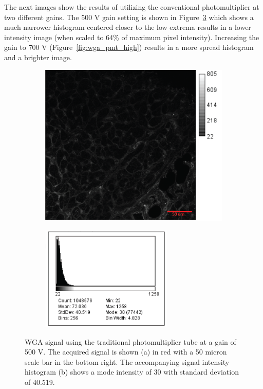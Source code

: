 \documentclass[12pt]{article}
\begin{document}
The next images show the results of utilizing the conventional photomultiplier at two different gains. The 500 V gain setting is shown in Figure~\ref{fig:wga_pmt_low} which shows a much narrower histogram centered closer to the low extrema results in a lower intensity image (when scaled to 64\% of maximum pixel intensity). Increasing the gain to 700 V (Figure~\ref{fig:wga_pmt_high}) results in a more spread histogram and a brighter image.

\begin{figure}[H]
	\begin{subfigure}{.5\textwidth}
		\centering
		\includegraphics[width=.95\linewidth]{FinalFigures/WGA_PMT_low.png}
		\caption{}
		\label{fig:wga_pmt_l}
	\end{subfigure}%
	\begin{subfigure}{.5\textwidth}
		\centering
		\includegraphics[width=.95\linewidth]{FinalFigures/WGA_PMT_low_hist.png}
		\caption{}
		\label{fig:wga_pmt_l_hist}
	\end{subfigure}
	\caption{WGA signal using the traditional photomultiplier tube at a gain of 500 V. The acquired signal is shown (a) in red with a 50 micron scale bar in the bottom right. The accompanying signal intensity histogram (b) shows a mode intensity of 30 with standard deviation of 40.519.}
	\label{fig:wga_pmt_low}
\end{figure}
\end{document}
